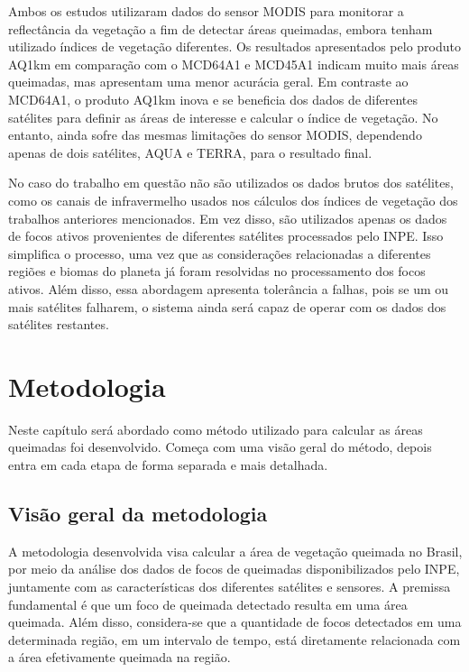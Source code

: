 \documentclass[cic,tc]{iiufrgs}
\begin{document}
Ambos os estudos utilizaram dados do sensor MODIS para monitorar a reflectância da vegetação a fim de detectar áreas queimadas, embora tenham utilizado índices de vegetação diferentes. Os resultados apresentados pelo produto AQ1km em comparação com o MCD64A1 e MCD45A1 indicam muito mais áreas queimadas, mas apresentam uma menor acurácia geral. Em contraste ao MCD64A1, o produto AQ1km inova e se beneficia dos dados de diferentes satélites para definir as áreas de interesse e calcular o índice de vegetação. No entanto, ainda sofre das mesmas limitações do sensor MODIS, dependendo apenas de dois satélites, AQUA e TERRA, para o resultado final. \par

No caso do trabalho em questão não são utilizados os dados brutos dos satélites, como os canais de infravermelho usados nos cálculos dos índices de vegetação dos trabalhos anteriores mencionados. Em vez disso, são utilizados apenas os dados de focos ativos provenientes de diferentes satélites processados pelo INPE. Isso simplifica o processo, uma vez que as considerações relacionadas a diferentes regiões e biomas do planeta já foram resolvidas no processamento dos focos ativos. Além disso, essa abordagem apresenta tolerância a falhas, pois se um ou mais satélites falharem, o sistema ainda será capaz de operar com os dados dos satélites restantes. \par




\chapter{Metodologia}

Neste capítulo será abordado como método utilizado para calcular as áreas queimadas foi desenvolvido. Começa com uma visão geral do método, depois entra em cada etapa de forma separada e mais detalhada.

\section{Visão geral da metodologia}

A metodologia desenvolvida visa calcular a área de vegetação queimada no Brasil, por meio da análise dos dados de focos de queimadas disponibilizados pelo INPE, juntamente com as características dos diferentes satélites e sensores. A premissa fundamental é que um foco de queimada detectado resulta em uma área queimada. Além disso, considera-se que a quantidade de focos detectados em uma determinada região, em um intervalo de tempo, está diretamente relacionada com a área efetivamente queimada na região. \par 
\end{document}
